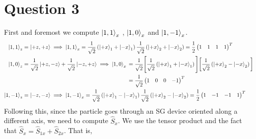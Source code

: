 \documentclass[12pt]{article}
\theoremstyle{definition}
\theoremstyle{definition}
\theoremstyle{definition}
\theoremstyle{definition}
\theoremstyle{definition}
\theoremstyle{example}
\theoremstyle{note}
\theoremstyle{remark}
\theoremstyle{example}
\begin{document}
 			\section*{Question 3}
 				First and foremost we compute $\ket{1,1}_{x}$ , $\ket{1,0}_{x}$ and $\ket{1,-1}_{x}$. 
 				\begin{align*}
	 					\ket{1,1}_{z} &= \ket{+z, +z} \implies \ket{1,1}_{x} =  \frac{1}{\sqrt{2}}\left(\ket{+x}_{1} + \ket{-x}_{1}\right) \frac{1}{\sqrt{2}} \left(\ket{+x}_{2} + \ket{-x}_{2}\right) = \frac12 \begin{pmatrix}
	 						1 & 1 & 1 &1
	 					\end{pmatrix}^{T}\\
	 					\ket{1,0}_{z} &= \frac{1}{\sqrt{2}} \ket{+z,-z} + \frac{1}{\sqrt{2}} \ket{-z,+z} \implies \ket{1,0}_{x}  \begin{aligned}[t]
	 						& =\frac{1}{\sqrt{2}} \Bigg[\frac{1}{\sqrt{2}} \left(\ket{+x}_{1} + \ket{-x}_{1}\right)\Bigg]\bigg[\frac{1}{\sqrt{2}} \left(\ket{+x}_{2} - \ket{-x}_{2}\right)\bigg] \\
	 						&= \frac{1}{\sqrt{2}} \begin{pmatrix}
	 							1 & 0 & 0 & -1
	 						\end{pmatrix}^{T} 
	 					\end{aligned}\\
	 					\ket{1,-1}_{z} &= \ket{-z,-z} \implies \ket{1,-1}_{x} =  \frac{1}{\sqrt{2}}\left(\ket{+x}_{1} - \ket{-x}_{1}\right) \frac{1}{\sqrt{2}} \left(\ket{+x}_{2} - \ket{-x}_{2}\right) = \frac12 \begin{pmatrix}
	 					1 & -1 & -1 &1
	 					\end{pmatrix}^{T}
 				\end{align*}
 				Following this, since the particle goes through an SG device oriented along a different axis, we need to compute $\hat{S}_{x}$. We use the tensor product and the fact that $\hat{S}_{x} = \hat{S}_{1x} + \hat{S}_{2x}$.  That is, 
\end{document}
